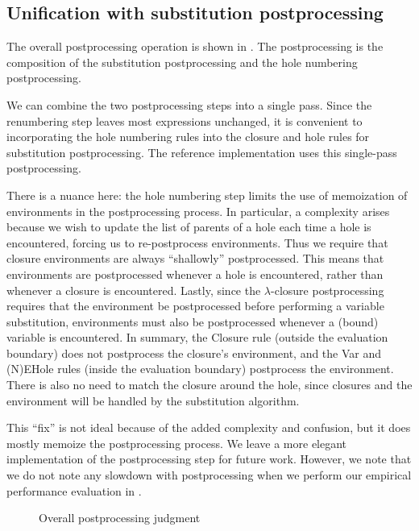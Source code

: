 \subsection{Unification with substitution postprocessing}
\label{sec:unification-postprocessing}

The overall postprocessing operation is shown in . The postprocessing is the composition of the substitution postprocessing and the hole numbering postprocessing.

We can combine the two postprocessing steps into a single pass. Since the renumbering step leaves most expressions unchanged, it is convenient to incorporating the hole numbering rules into the closure and hole rules for substitution postprocessing. The reference implementation uses this single-pass postprocessing.

There is a nuance here: the hole numbering step limits the use of memoization of environments in the postprocessing process. In particular, a complexity arises because we wish to update the list of parents of a hole each time a hole is encountered, forcing us to re-postprocess environments. Thus we require that closure environments are always ``shallowly'' postprocessed. This means that environments are postprocessed whenever a hole is encountered, rather than whenever a closure is encountered. Lastly, since the $\lambda$-closure postprocessing requires that the environment be postprocessed before performing a variable substitution, environments must also be postprocessed whenever a (bound) variable is encountered. In summary, the \pplcl{}Closure rule (outside the evaluation boundary) does not postprocess the closure's environment, and the \pplcl{}Var and \pplcl{}(N)EHole rules (inside the evaluation boundary) postprocess the environment. There is also no need to match the closure around the hole, since closures and the environment will be handled by the substitution algorithm.

This ``fix'' is not ideal because of the added complexity and confusion, but it does mostly memoize the postprocessing process. We leave a more elegant implementation of the postprocessing step for future work. However, we note that we do not note any slowdown with postprocessing when we perform our empirical performance evaluation in .

\begin{figure}
  \centering
  \begin{mdframed}
    \begin{singlespace}
      
    \end{singlespace}
  \end{mdframed}
  \caption{Overall postprocessing judgment}
  \label{fig:big-step-postprocessing-rules}
\end{figure}

